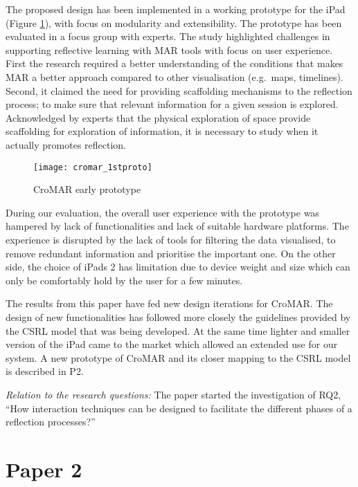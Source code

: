 The proposed design has been implemented in a working prototype for the
iPad (Figure \ref{fig:cromar-prototype}), with focus on modularity and
extensibility. The prototype has been evaluated in a focus group with
experts. The study highlighted challenges in supporting reflective
learning with MAR tools with focus on user experience. First the
research required a better understanding of the conditions that makes
MAR a better approach compared to other visualisation (e.g.~maps,
timelines). Second, it claimed the need for providing scaffolding
mechanisms to the reflection process; to make sure that relevant
information for a given session is explored. Acknowledged by experts
that the physical exploration of space provide scaffolding for
exploration of information, it is necessary to study when it actually
promotes reflection.

\begin{figure}[tbh]
    \centering
    \texttt{[image: cromar\_1stproto]}
    \caption{CroMAR early prototype}
    \label{fig:cromar-prototype}
\end{figure}

During our evaluation, the overall user experience with the prototype
was hampered by lack of functionalities and lack of suitable hardware
platforms. The experience is disrupted by the lack of tools for
filtering the data visualised, to remove redundant information and
prioritise the important one. On the other side, the choice of iPads 2
has limitation due to device weight and size which can only be
comfortably hold by the user for a few minutes.

The results from this paper have fed new design iterations for CroMAR.
The design of new functionalities has followed more closely the
guidelines provided by the CSRL model that was being developed. At the
same time lighter and smaller version of the iPad came to the market
which allowed an extended use for our system. A new prototype of CroMAR
and its closer mapping to the CSRL model is described in P2.

\emph{Relation to the research questions: } The paper started the
investigation of RQ2, ``How interaction techniques can be designed to
facilitate the different phases of a reflection processes?''

\section{Paper 2}\label{paper-2}

